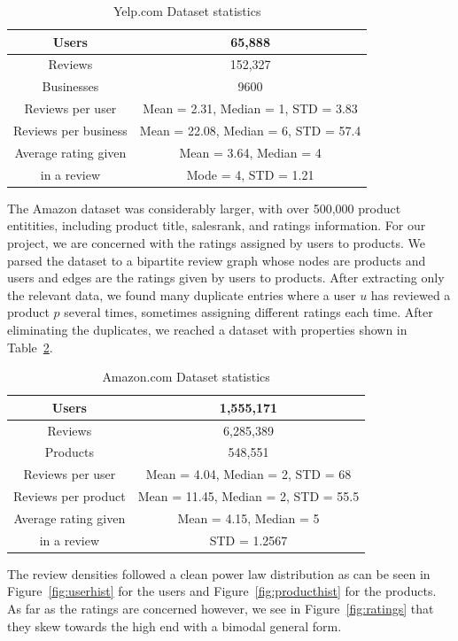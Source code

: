 \documentclass[letterpaper, 10 pt, twocolumn]{article}
\begin{document}
\begin{table}[htb]
\centering
\begin{tabular}{|c|c|}
\hline
Users &65,888 \tabularnewline \hline
Reviews &152,327 \tabularnewline \hline
Businesses &9600 \tabularnewline \hline
Reviews per user &Mean = 2.31, Median = 1, STD = 3.83 
\tabularnewline \hline
Reviews per business &Mean = 22.08, Median = 6, STD = 57.4 
\tabularnewline \hline
Average rating given &Mean = 3.64, Median = 4 \tabularnewline
in a review &Mode = 4, STD = 1.21 
\tabularnewline \hline

\end{tabular}
\caption{ Yelp.com Dataset statistics }
\label{table:yelpstats}
\end{table}

The Amazon dataset was considerably larger, with over 
500,000 product entitities, including product title, salesrank, and ratings 
information. For our project, we are concerned with the ratings assigned 
by users to products. We parsed the dataset to a bipartite review 
graph whose nodes are products and users and edges are the ratings given by 
users to products. After extracting only the relevant data, we found many 
duplicate entries where a user $u$ has reviewed a product $p$ several times, 
sometimes assigning different ratings each time. After eliminating the 
duplicates, we reached a dataset with properties shown in 
Table~\ref{table:amazonstats}.

\begin{table}[htb]
\centering
\begin{tabular}{|c|c|}
\hline
Users &1,555,171 \tabularnewline \hline
Reviews &6,285,389 \tabularnewline \hline
Products &548,551 \tabularnewline \hline
Reviews per user &Mean = 4.04, Median = 2, STD = 68
\tabularnewline \hline
Reviews per product &Mean = 11.45, Median = 2, STD = 55.5 
\tabularnewline \hline
Average rating given &Mean = 4.15, Median = 5 \tabularnewline
in a review &STD = 1.2567
\tabularnewline \hline

\end{tabular}
\caption{ Amazon.com Dataset statistics }
\label{table:amazonstats}
\end{table}

The review densities followed a clean power law distribution as can be seen
in Figure~\ref{fig:userhist} for the users and Figure~\ref{fig:producthist}
for the products. As far as the ratings are concerned however, we see in
Figure~\ref{fig:ratings} that they skew towards the high end with a bimodal
general form.
\end{document}
